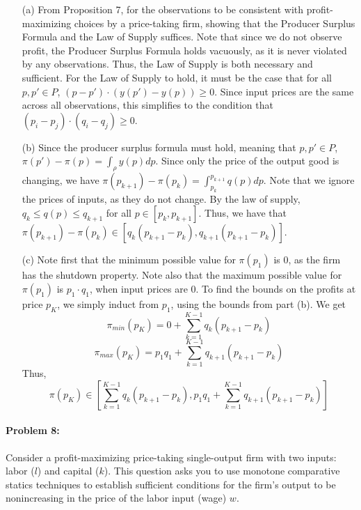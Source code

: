 \documentclass[12pt]{article}
\begin{document}
\begin{itemize}
    \item[(a)] From Proposition 7, for the observations to be consistent with profit-maximizing choices by a price-taking firm, showing that the Producer Surplus Formula and the Law of Supply suffices. Note that since we do not observe profit, the Producer Surplus Formula holds vacuously, as it is never violated by any observations. Thus, the Law of Supply is both necessary and sufficient. For the Law of Supply to hold, it must be the case that for all $p,p' \in P$, $(p - p')\cdot (y(p') - y(p)) \ge 0$. Since input prices are the same across all observations, this simplifies to the condition that $(p_i - p_j)\cdot(q_i - q_j) \ge 0$.

    \item[(b)] Since the producer surplus formula must hold, meaning that $p,p' \in P$, $\pi(p') - \pi(p) = \int_\rho y(p)dp$. Since only the price of the output good is changing, we have $\pi(p_{k+1}) - \pi(p_k) = \int_{p_k}^{p_{k+1}} q(p)dp$. Note that we ignore the prices of inputs, as they do not change. By the law of supply, $q_k \le q(p) \le q_{k+1}$ for all $p \in [p_k,p_{k+1}]$. Thus, we have that $\pi(p_{k+1}) - \pi(p_k) \in [q_k(p_{k+1}-p_k),q_{k+1}(p_{k+1}-p_k)]$.

    \item[(c)] Note first that the minimum possible value for $\pi(p_1)$ is 0, as the firm has the shutdown property. Note also that the maximum possible value for $\pi(p_1)$ is $p_1 \cdot q_1$, when input prices are 0. To find the bounds on the profits at price $p_K$, we simply induct from $p_1$, using the bounds from part (b). We get
    \[
    \pi_{min}(p_K) = 0 + \sum_{k=1}^{K-1}q_k(p_{k+1}-p_k)
    \]
    \[
    \pi_{max}(p_K) = p_1q_1 + \sum_{k=1}^{K-1}q_{k+1}(p_{k+1}-p_k)
    \]
    Thus,
    \[
    \pi(p_K) \in \left[\sum_{k=1}^{K-1}q_k(p_{k+1}-p_k),p_1q_1 + \sum_{k=1}^{K-1}q_{k+1}(p_{k+1}-p_k)\right]
    \]
\end{itemize}

\paragraph{Problem 8:} Consider a profit-maximizing price-taking single-output firm with two inputs: labor ($l$) and capital ($k$). This question asks you to use monotone comparative statics techniques to establish sufficient conditions for the firm's output to be nonincreasing in the price of the labor input (wage) $w$.
\end{document}
